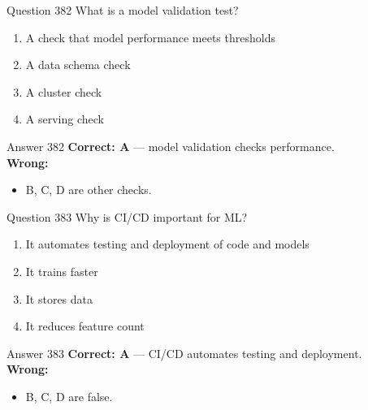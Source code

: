 \documentclass[aspectratio=169,11pt]{beamer}
\begin{document}
	\begin{frame}{Question 382}
		What is a model validation test?
		\begin{enumerate}[label=\Alph*.]
			\item A check that model performance meets thresholds
			\item A data schema check
			\item A cluster check
			\item A serving check
		\end{enumerate}
	\end{frame}
	\begin{frame}{Answer 382}
		\textbf{Correct: A} --- model validation checks performance.\\
		\vspace{0.5em}
		\textbf{Wrong:}
		\begin{itemize}
			\item B, C, D are other checks.
		\end{itemize}
	\end{frame}
	
	\begin{frame}{Question 383}
		Why is CI/CD important for ML?
		\begin{enumerate}[label=\Alph*.]
			\item It automates testing and deployment of code and models
			\item It trains faster
			\item It stores data
			\item It reduces feature count
		\end{enumerate}
	\end{frame}
	\begin{frame}{Answer 383}
		\textbf{Correct: A} --- CI/CD automates testing and deployment.\\
		\vspace{0.5em}
		\textbf{Wrong:}
		\begin{itemize}
			\item B, C, D are false.
		\end{itemize}
	\end{frame}
	
\end{document}
